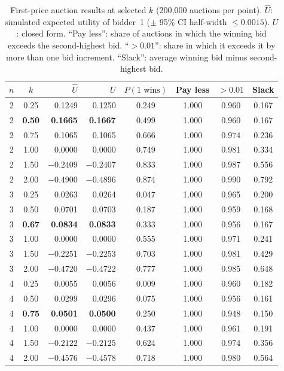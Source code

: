 \documentclass[11pt,a4paper]{article}
\begin{document}
\begin{table}[!htbp]
\centering
\caption{First-price auction results at selected $k$ (200{,}000 auctions per point). $\hat U$:
simulated expected utility of bidder~1 ($\pm$ 95\% CI half-width $\le 0.0015$). $U$: closed
form. ``Pay less'': share of auctions in which the winning bid exceeds the second-highest bid.
``$>0.01$'': share in which it exceeds it by more than one bid increment. ``Slack'': average
winning bid minus second-highest bid.}
\label{tab:p2}
\small
\begin{tabular}{c c rr c c c c}
\toprule
$n$ & $k$ & $\hat U$ & $U$ & $P(\text{1 wins})$ & Pay less & $>0.01$ & Slack \\
\midrule
2 & 0.25 & 0.1249 & 0.1250 & 0.249 & 1.000 & 0.960 & 0.167 \\
2 & \textbf{0.50} & \textbf{0.1665} & \textbf{0.1667} & 0.499 & 1.000 & 0.960 & 0.167 \\
2 & 0.75 & 0.1065 & 0.1065 & 0.666 & 1.000 & 0.974 & 0.236 \\
2 & 1.00 & 0.0000 & 0.0000 & 0.749 & 1.000 & 0.981 & 0.334 \\
2 & 1.50 & $-0.2409$ & $-0.2407$ & 0.833 & 1.000 & 0.987 & 0.556 \\
2 & 2.00 & $-0.4900$ & $-0.4896$ & 0.874 & 1.000 & 0.990 & 0.792 \\
\midrule
3 & 0.25 & 0.0263 & 0.0264 & 0.047 & 1.000 & 0.965 & 0.200 \\
3 & 0.50 & 0.0701 & 0.0703 & 0.187 & 1.000 & 0.959 & 0.168 \\
3 & \textbf{0.67} & \textbf{0.0834} & \textbf{0.0833} & 0.333 & 1.000 & 0.956 & 0.167 \\
3 & 1.00 & 0.0000 & 0.0000 & 0.555 & 1.000 & 0.971 & 0.241 \\
3 & 1.50 & $-0.2251$ & $-0.2253$ & 0.703 & 1.000 & 0.981 & 0.429 \\
3 & 2.00 & $-0.4720$ & $-0.4722$ & 0.777 & 1.000 & 0.985 & 0.648 \\
\midrule
4 & 0.25 & 0.0055 & 0.0056 & 0.009 & 1.000 & 0.960 & 0.182 \\
4 & 0.50 & 0.0299 & 0.0296 & 0.075 & 1.000 & 0.956 & 0.161 \\
4 & \textbf{0.75} & \textbf{0.0501} & \textbf{0.0500} & 0.250 & 1.000 & 0.948 & 0.150 \\
4 & 1.00 & 0.0000 & 0.0000 & 0.437 & 1.000 & 0.961 & 0.191 \\
4 & 1.50 & $-0.2122$ & $-0.2125$ & 0.624 & 1.000 & 0.974 & 0.356 \\
4 & 2.00 & $-0.4576$ & $-0.4578$ & 0.718 & 1.000 & 0.980 & 0.564 \\
\bottomrule
\end{tabular}
\end{table}
\end{document}
